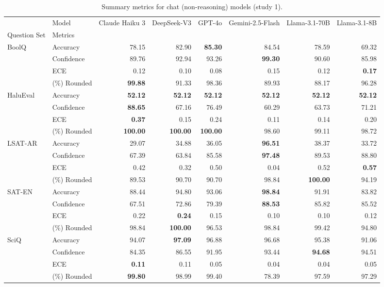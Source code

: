 \begin{table}
\caption{Summary metrics for chat (non-reasoning) models (study 1).}
\label{tab:study1_summary_chat}
\begin{tabular}{llrrrrrr}
\toprule
 & Model & Claude Haiku 3 & DeepSeek-V3 & GPT-4o & Gemini-2.5-Flash & Llama-3.1-70B & Llama-3.1-8B \\
Question Set & Metrics &  &  &  &  &  &  \\
\midrule
\multirow[c]{4}{*}{BoolQ} & Accuracy & 78.15 & 82.90 & \textbf{85.30} & 84.54 & 78.59 & 69.32 \\
 & Confidence & 89.76 & 92.94 & 93.26 & \textbf{99.30} & 90.60 & 85.98 \\
 & ECE & 0.12 & 0.10 & 0.08 & 0.15 & 0.12 & \textbf{0.17} \\
 & (\%) Rounded & \textbf{99.88} & 91.33 & 98.36 & 89.93 & 88.17 & 96.28 \\
\multirow[c]{4}{*}{HaluEval} & Accuracy & \textbf{52.12} & \textbf{52.12} & \textbf{52.12} & \textbf{52.12} & \textbf{52.12} & \textbf{52.12} \\
 & Confidence & \textbf{88.65} & 67.16 & 76.49 & 60.29 & 63.73 & 71.21 \\
 & ECE & \textbf{0.37} & 0.15 & 0.24 & 0.11 & 0.14 & 0.20 \\
 & (\%) Rounded & \textbf{100.00} & \textbf{100.00} & \textbf{100.00} & 98.60 & 99.11 & 98.72 \\
\multirow[c]{4}{*}{LSAT-AR} & Accuracy & 29.07 & 34.88 & 36.05 & \textbf{96.51} & 38.37 & 33.72 \\
 & Confidence & 67.39 & 63.84 & 85.58 & \textbf{97.48} & 89.53 & 88.80 \\
 & ECE & 0.42 & 0.32 & 0.50 & 0.04 & 0.52 & \textbf{0.57} \\
 & (\%) Rounded & 89.53 & 90.70 & 90.70 & 98.84 & \textbf{100.00} & 94.19 \\
\multirow[c]{4}{*}{SAT-EN} & Accuracy & 88.44 & 94.80 & 93.06 & \textbf{98.84} & 91.91 & 83.82 \\
 & Confidence & 67.51 & 72.86 & 79.39 & \textbf{88.53} & 85.82 & 85.52 \\
 & ECE & 0.22 & \textbf{0.24} & 0.15 & 0.10 & 0.10 & 0.12 \\
 & (\%) Rounded & 98.84 & \textbf{100.00} & 96.53 & 98.84 & 99.42 & 94.80 \\
\multirow[c]{4}{*}{SciQ} & Accuracy & 94.07 & \textbf{97.09} & 96.88 & 96.68 & 95.38 & 91.06 \\
 & Confidence & 84.35 & 86.55 & 91.95 & 93.44 & \textbf{94.68} & 94.51 \\
 & ECE & \textbf{0.11} & 0.11 & 0.05 & 0.04 & 0.04 & 0.05 \\
 & (\%) Rounded & \textbf{99.80} & 98.99 & 99.40 & 78.39 & 97.59 & 97.29 \\
\bottomrule
\end{tabular}
\end{table}
